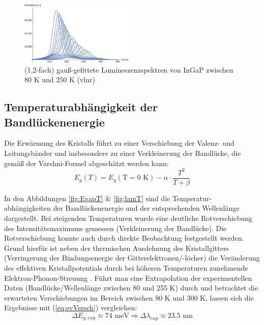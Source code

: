 \documentclass[aps,twocolumn,secnumarabic,nobalancelastpage,amsmath,amssymb,
nofootinbib,superscriptaddress]{revtex4-1}
\begin{document}
\begin{figure}[t]
  \centering
  \includegraphics[width=0.48\textwidth]{../Messung/allfitsplot.eps}
  \caption{\label{fig:spek} (1,2-fach) gauß-gefittete Lumineszenzspektren von InGaP zwischen $80\text{ K}$ und $250\text{ K}$ (vlnr)}
\end{figure}

\subsection{Temperaturabhängigkeit der Bandlückenenergie}

\noindent Die Erwärmung des Kristalls führt zu einer Verschiebung der Valenz- und Leitungsbänder und insbesondere
zu einer Verkleinerung der Bandlücke, die gemäß der Varshni-Formel abgeschätzt werden kann:
\begin{equation}
  E_g(T) = E_g(\text{T}=0\text{ K})-\alpha\cdot\frac{T^2}{T+\beta}
   \label{eq:varshni}
\end{equation}

\noindent In den Abbildungen \ref{fig:EgapT} \& \ref{fig:lamT} sind die Temperatur-
abhängigkeiten der Bandlückenenergie und der entsprechenden Wellenlänge dargestellt. Bei steigenden Temperaturen wurde eine deutliche
Rotverschiebung des Intensitätsmaximums gemessen (Verkleinerung der Bandlücke). Die Rotverschiebung konnte auch durch
direkte Beobachtung festgestellt werden. Grund hierfür ist neben der thermischen Ausdehnung des Kristallgitters (Verringerung
der Bindungsenergie der Gitterelektronen/-löcher) die Veränderung des effektiven Kristallpotentials durch bei höheren Temperaturen
zunehmende Elektron-Phonon-Streuung \cite{kittel}. Führt man eine Extrapolation der experimentellen Daten (Bandlücke/Wellenlänge zwischen 80
und 255 K) durch und betrachtet die erwarteten Verschiebungen im Bereich zwischen 80 K und 300 K, lassen sich die Ergebnisse mit (\ref{eq:evVersch})
vergleichen:
\begin{equation}
  \Delta E_{g,exp}\approx 74\text{ meV} \Rightarrow \Delta\lambda_{exp}\approx 23.5\text{ nm}
   \label{eq:expVersch}
\end{equation}
\end{document}
